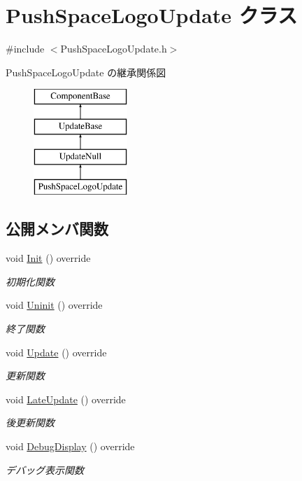 \hypertarget{class_push_space_logo_update}{}\section{Push\+Space\+Logo\+Update クラス}
\label{class_push_space_logo_update}


{\ttfamily \#include $<$Push\+Space\+Logo\+Update.\+h$>$}

Push\+Space\+Logo\+Update の継承関係図\begin{figure}[H]
\begin{center}
\leavevmode
\includegraphics[height=4.000000cm]{class_push_space_logo_update}
\end{center}
\end{figure}
\subsection*{公開メンバ関数}
\begin{DoxyCompactItemize}
\item 
void \mbox{\hyperlink{class_push_space_logo_update_a9c165604160c012b429c1db1d67ffb2a}{Init}} () override
\begin{DoxyCompactList}\small\item\em 初期化関数 \end{DoxyCompactList}\item 
void \mbox{\hyperlink{class_push_space_logo_update_a94f791874cb6160cd33cd7068fcde0d0}{Uninit}} () override
\begin{DoxyCompactList}\small\item\em 終了関数 \end{DoxyCompactList}\item 
void \mbox{\hyperlink{class_push_space_logo_update_aa07fe6f6f4f072e1f81bc6708dd4727e}{Update}} () override
\begin{DoxyCompactList}\small\item\em 更新関数 \end{DoxyCompactList}\item 
void \mbox{\hyperlink{class_push_space_logo_update_a4423864fb22b1211e92a4317d0b70a44}{Late\+Update}} () override
\begin{DoxyCompactList}\small\item\em 後更新関数 \end{DoxyCompactList}\item 
void \mbox{\hyperlink{class_push_space_logo_update_ab18a0c905455da17f9e2f1fe5f0c34e6}{Debug\+Display}} () override
\begin{DoxyCompactList}\small\item\em デバッグ表示関数 \end{DoxyCompactList}\end{DoxyCompactItemize}


